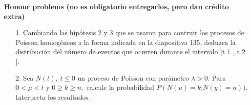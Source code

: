 \documentclass[11pt,letterpaper]{article}
\begin{document}
\textbf{Honour problems (no es obligatorio entregarlos, pero dan crédito extra)}\\

\begin{itemize}
\item[1.] Cambiando las hipótesis 2 y 3 que se usaron para contruir los procesos de Poisson homogéneos
a la forma indicada en la diapositiva 135, deduzca la distribución del número de eventos que
ocurren durante el intervalo [t 1 , t 2 ].

\item[2.] Sea $N(t), \ t\leq 0$ un proceso de Poisson con parámetro $\lambda >0$. Para $0<\mu <t$ y $0\geq k\geq n,$ calcule la probabilidad $P(N(u)=k|N(y)=n)).$ Interpreta los resultados.
\end{itemize}
\end{document}
